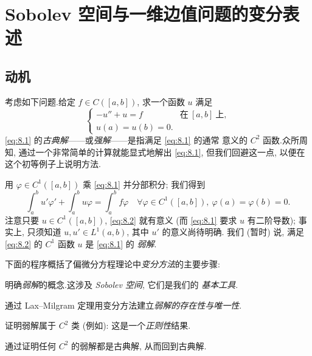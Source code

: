 
\chapter{Sobolev 空间与一维边值问题的变分表述}
\label{chap:8}

\section{动机}
\label{sec:8.1}

考虑如下问题.给定 $f\in C([a,b])$, 求一个函数 $u$ 满足
\begin{equation}
\begin{cases}
-u''+u=f & \text{在}\ [a,b]\ \text{上},\\
u(a)=u(b)=0.
\end{cases}
\label{eq:8.1}
\end{equation}
\eqref{eq:8.1} 的\emph{古典解}——或\emph{强解}——是指满足 \eqref{eq:8.1} 的通常
意义的 $C^2$ 函数.众所周知, 通过一个非常简单的计算就能显式地解出
\eqref{eq:8.1}, 但我们回避这一点, 以便在这个初等例子上说明方法.

用 $\varphi\in C^1([a,b])$ 乘 \eqref{eq:8.1} 并分部积分; 我们得到
\begin{equation}
\int_a^b u'\varphi'+\int_a^b u\varphi=\int_a^b f\varphi
\quad\forall\varphi\in C^1([a,b]),\ \varphi(a)=\varphi(b)=0.
\label{eq:8.2}
\end{equation}
注意只要 $u\in C^1([a,b])$, \eqref{eq:8.2} 就有意义 (而 \eqref{eq:8.1} 要求
$u$ 有二阶导数); 事实上, 只须知道 $u,u'\in L^1(a,b)$, 其中 $u'$ 的意义尚待明确.
我们 (暂时) 说, 满足 \eqref{eq:8.2} 的 $C^1$ 函数 $u$ 是 \eqref{eq:8.1} 的
\emph{弱解}.

下面的程序概括了偏微分方程理论中\emph{变分方法}的主要步骤:

 明确\emph{弱解}的概念.这涉及 \emph{Sobolev 空间}, 它们是我们的
\emph{基本工具}.

 通过 Lax--Milgram 定理用变分方法建立\emph{弱解的存在性与唯一性}.

 证明弱解属于 $C^2$ 类 (例如): 这是一个\emph{正则性}结果.

 通过证明任何 $C^2$ 的弱解都是古典解, 从而回到古典解.

